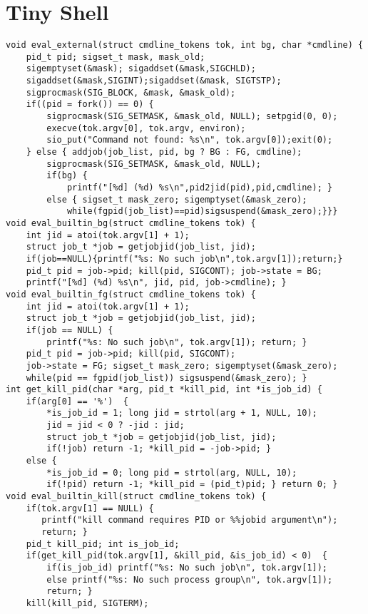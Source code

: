 \section{Tiny Shell}
\begin{verbatim}
void eval_external(struct cmdline_tokens tok, int bg, char *cmdline) {
    pid_t pid; sigset_t mask, mask_old;
    sigemptyset(&mask); sigaddset(&mask,SIGCHLD);
    sigaddset(&mask,SIGINT);sigaddset(&mask, SIGTSTP); 
    sigprocmask(SIG_BLOCK, &mask, &mask_old);
    if((pid = fork()) == 0) {
        sigprocmask(SIG_SETMASK, &mask_old, NULL); setpgid(0, 0);
        execve(tok.argv[0], tok.argv, environ);
        sio_put("Command not found: %s\n", tok.argv[0]);exit(0);
    } else { addjob(job_list, pid, bg ? BG : FG, cmdline);
        sigprocmask(SIG_SETMASK, &mask_old, NULL);
        if(bg) {
            printf("[%d] (%d) %s\n",pid2jid(pid),pid,cmdline); }
        else { sigset_t mask_zero; sigemptyset(&mask_zero);
            while(fgpid(job_list)==pid)sigsuspend(&mask_zero);}}}
void eval_builtin_bg(struct cmdline_tokens tok) {
    int jid = atoi(tok.argv[1] + 1);
    struct job_t *job = getjobjid(job_list, jid);
    if(job==NULL){printf("%s: No such job\n",tok.argv[1]);return;}
    pid_t pid = job->pid; kill(pid, SIGCONT); job->state = BG; 
    printf("[%d] (%d) %s\n", jid, pid, job->cmdline); }
void eval_builtin_fg(struct cmdline_tokens tok) {
    int jid = atoi(tok.argv[1] + 1);
    struct job_t *job = getjobjid(job_list, jid);
    if(job == NULL) {
        printf("%s: No such job\n", tok.argv[1]); return; }
    pid_t pid = job->pid; kill(pid, SIGCONT);
    job->state = FG; sigset_t mask_zero; sigemptyset(&mask_zero);
    while(pid == fgpid(job_list)) sigsuspend(&mask_zero); }
int get_kill_pid(char *arg, pid_t *kill_pid, int *is_job_id) {
    if(arg[0] == '%')  {
        *is_job_id = 1; long jid = strtol(arg + 1, NULL, 10);
        jid = jid < 0 ? -jid : jid;
        struct job_t *job = getjobjid(job_list, jid);
        if(!job) return -1; *kill_pid = -job->pid; }
    else {
        *is_job_id = 0; long pid = strtol(arg, NULL, 10);
        if(!pid) return -1; *kill_pid = (pid_t)pid; } return 0; }
void eval_builtin_kill(struct cmdline_tokens tok) {
    if(tok.argv[1] == NULL) {
       printf("kill command requires PID or %%jobid argument\n");
       return; }
    pid_t kill_pid; int is_job_id;
    if(get_kill_pid(tok.argv[1], &kill_pid, &is_job_id) < 0)  {
        if(is_job_id) printf("%s: No such job\n", tok.argv[1]);
        else printf("%s: No such process group\n", tok.argv[1]);
        return; }
    kill(kill_pid, SIGTERM);

\end{verbatim}
